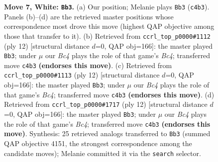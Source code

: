 \documentclass[11pt]{article}
\begin{document}
\begin{figure}[p]
\caption{\textbf{Move 7, White: \texttt{Bb3}.} (a) Our position; Melanie plays \texttt{Bb3} (\texttt{c4b3}). Panels (b)--(d) are the retrieved master positions whose correspondence most drove this move (highest QAP objective among those that transfer to it). (b) Retrieved from \texttt{ccrl\_top\_p0000\#1112} (ply 12) [structural distance $d$=0, QAP obj=166]: the master played \texttt{Bb3}; under $\mu$ our \emph{Bc4} plays the role of that game's \emph{Bc4}; transferred move \texttt{c4b3} \textbf{(endorses this move)}. (c) Retrieved from \texttt{ccrl\_top\_p0000\#1113} (ply 12) [structural distance $d$=0, QAP obj=166]: the master played \texttt{Bb3}; under $\mu$ our \emph{Bc4} plays the role of that game's \emph{Bc4}; transferred move \texttt{c4b3} \textbf{(endorses this move)}. (d) Retrieved from \texttt{ccrl\_top\_p0000\#1717} (ply 12) [structural distance $d$=0, QAP obj=166]: the master played \texttt{Bb3}; under $\mu$ our \emph{Bc4} plays the role of that game's \emph{Bc4}; transferred move \texttt{c4b3} \textbf{(endorses this move)}. Synthesis: 25 retrieved analogs transferred to \texttt{Bb3} (summed QAP objective 4151, the strongest correspondence among the candidate moves); Melanie committed it via the \texttt{search} selector.}
\label{fig:thought-m12}
\end{figure}

\clearpage
\end{document}
